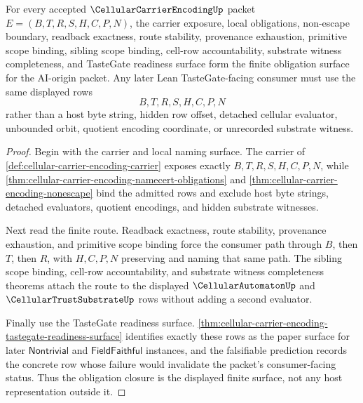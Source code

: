 \begin{theorem}
\label{thm:cellular-carrier-encoding-status-obligation-closure}
For every accepted $\CellularCarrierEncodingUp$ packet $E=(B,T,R,S,H,C,P,N)$, the carrier exposure, local \NameCert{} obligations, non-escape boundary, readback exactness, route stability, provenance exhaustion, primitive scope binding, sibling scope binding, cell-row accountability, substrate witness completeness, and TasteGate readiness surface form the finite obligation surface for the AI-origin packet. Any later Lean TasteGate-facing consumer must use the same displayed rows
$$
B,T,R,S,H,C,P,N
$$
rather than a host byte string, hidden row offset, detached cellular evaluator, unbounded orbit, quotient encoding coordinate, or unrecorded substrate witness.
\end{theorem}
\begin{proof}
Begin with the carrier and local naming surface. The carrier of \autoref{def:cellular-carrier-encoding-carrier} exposes exactly $B,T,R,S,H,C,P,N$, while \autoref{thm:cellular-carrier-encoding-namecert-obligations} and \autoref{thm:cellular-carrier-encoding-nonescape} bind the admitted rows and exclude host byte strings, detached evaluators, quotient encodings, and hidden substrate witnesses.

Next read the finite route. Readback exactness, route stability, provenance exhaustion, and primitive scope binding force the consumer path through $B$, then $T$, then $R$, with $H,C,P,N$ preserving and naming that same path. The sibling scope binding, cell-row accountability, and substrate witness completeness theorems attach the route to the displayed $\CellularAutomatonUp$ and $\CellularTrustSubstrateUp$ rows without adding a second evaluator.

Finally use the TasteGate readiness surface. \autoref{thm:cellular-carrier-encoding-tastegate-readiness-surface} identifies exactly these rows as the paper surface for later $\mathsf{Nontrivial}$ and $\mathsf{FieldFaithful}$ instances, and the falsifiable prediction records the concrete row whose failure would invalidate the packet's consumer-facing status. Thus the obligation closure is the displayed finite surface, not any host representation outside it.
\end{proof}

